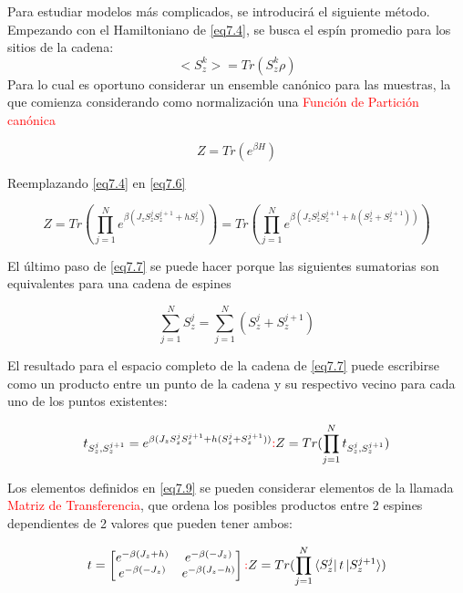 \documentclass{book}
\begin{document}
Para estudiar modelos más complicados, se introducirá el siguiente método. Empezando con el Hamiltoniano de \ref{eq7.4}, se busca el espín promedio para los sitios de la cadena:
\begin{equation}\label{eq7.5} <S_z^k>=Tr(S_z^k\rho)\end{equation}
Para lo cual es oportuno considerar un ensemble canónico para las muestras, la que comienza considerando como normalización una \textcolor{red}{Función de Partición canónica}

\begin{equation}\label{eq7.6} Z=Tr(e^{\beta H})\end{equation}

Reemplazando \ref{eq7.4} en \ref{eq7.6}

\begin{equation}\label{eq7.7} Z=Tr(\prod_{j=1}^N e^{\beta(J_z S_z^j S_z^{j+1}+hS_z^j)})=Tr(\prod_{j=1}^N e^{\beta(J_z S_z^j S_z^{j+1}+h(S_z^j+S_z^{j+1}))}) \end{equation}
 
El último paso de \ref{eq7.7} se puede hacer porque las siguientes sumatorias son equivalentes para una cadena de espines

\begin{equation}\label{eq7.8}\sum_{j=1}^N S_z^j=\sum_{j=1}^N (S_z^j+S_z^{j+1})\end{equation}

El resultado para el espacio completo de la cadena de \ref{eq7.7} puede escribirse como un producto entre un punto de la cadena y su respectivo vecino para cada uno de los puntos existentes:

\begin{equation}\label{eq7.9}t_{S_z^j,S^{j+1}_z}=e^{\beta(J_z S_z^j S_z^{j+1}+h(S_z^j+S_z^{j+1}))} \textcolor{red}{:} Z=Tr(\prod_{j=1}^N t_{S^j_z,S^{j+1}_z})\end{equation}

Los elementos definidos en \ref{eq7.9} se pueden considerar elementos de la llamada \textcolor{red}{Matriz de Transferencia}, que ordena los posibles productos entre 2 espines dependientes de 2 valores que pueden tener ambos:

\begin{equation}\label{eq7.10} t=\begin{bmatrix}e^{-\beta(J_z+h)} & e^{-\beta(-J_z)}\\ e^{-\beta(-J_z)} & e^{-\beta(J_z-h)}\end{bmatrix}\textcolor{red}{:} Z=Tr(\prod_{j=1}^N \bra{S_z^j}t\ket{S_z^{j+1}})\end{equation}
\end{document}
